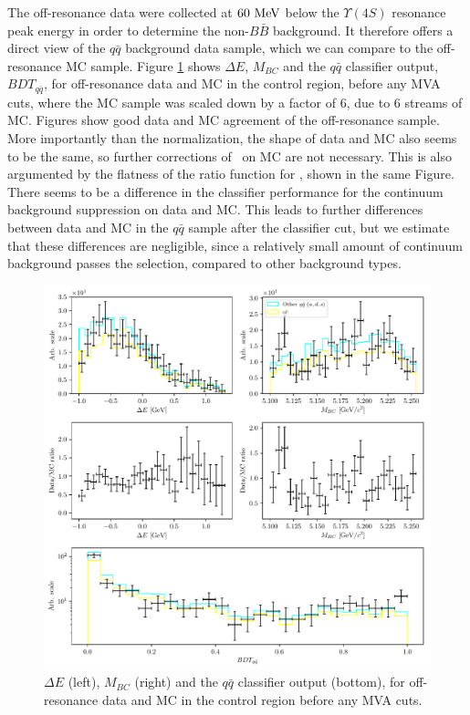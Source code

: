 The off-resonance data were collected at $60\mathrm{~MeV}$ below the $\Upsilon(4S)$ resonance peak energy in order to determine the non-$B\bar B$ background. It therefore offers a direct view of the $q\bar q$ background data sample, which we can compare to the off-resonance MC sample. Figure \ref{fig:offres_control} shows $\Delta E$, $M_{BC}$ and the $q \bar q$ classifier output, $BDT_{q\bar q}$, for off-resonance data and MC in the control region, before any MVA cuts, where the MC sample was scaled down by a factor of $6$, due to 6 streams of MC. Figures show good data and MC agreement of the off-resonance sample. More importantly than the normalization, the shape of data and MC also seems to be the same, so further corrections of \vars~on MC are not necessary. This is also argumented by the flatness of the ratio function for \vars, shown in the same Figure. There seems to be a difference in the classifier performance for the continuum background suppression on data and MC. This leads to further differences between data and MC in the $q \bar q$ sample after the classifier cut, but we estimate that these differences are negligible, since a relatively small amount of continuum background passes the selection, compared to other background types.
\begin{figure}[H]
\centering
\captionsetup{width=0.8\linewidth}
\includegraphics[width=\linewidth]{fig/offres_control}
\caption{$\Delta E$ (left), $M_{BC}$ (right) and the $q \bar q$ classifier output (bottom), for off-resonance data and MC in the control region before any MVA cuts.}
\label{fig:offres_control}
\end{figure}

